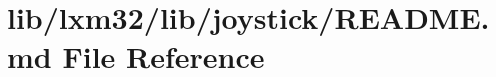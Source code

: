 \hypertarget{lib_2lxm32_2lib_2joystick_2_r_e_a_d_m_e_8md}{}\section{lib/lxm32/lib/joystick/\+R\+E\+A\+D\+ME.md File Reference}
\label{lib_2lxm32_2lib_2joystick_2_r_e_a_d_m_e_8md}
